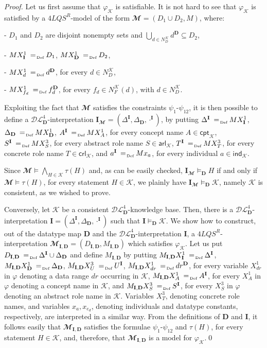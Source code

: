 \documentclass[a4paper]{llncs}
\newcommand{\defAs}{\mathrel{\makebox{\:= \hspace{-.2cm} \raisebox{-0.5 ex}[0 ex][0 ex]{\tiny Def}}}}
\newcommand{\shdlss}{\mathcal{DL}_{\D}^{4}}
\newcommand{\flqsr}{\ensuremath{4LQS^R}}
\newcommand{\I}{\mathbf{I}}
\newcommand{\D}{\mathbf{D}}
\newcommand{\ck}{\mathsf{cpt}_\mathcal{K}}
\newcommand{\ark}{\mathsf{arl}_\mathcal{K}}
\newcommand{\crk}{\mathsf{crl}_\mathcal{K}}
\newcommand{\ik}{\mathsf{ind}_\mathcal{K}}
\begin{document}
\begin{proof}
Let us first assume that $\varphi_{\mathcal{K}}$ is satisfiable. It is not hard to see that $\varphi_{\mathcal{K}}$ is satisfied by a \flqsr-model of the form $\mathbfcal{M} = (D_1 \cup D_2, M)$, where:

\medskip
- $D_1$ and $D_2$ are disjoint nonempty sets and $\underset{d \in N_{D}^\mathcal{K}}\bigcup d^{\D} \subseteq D_2$,

- $MX_{\I}^1 \defAs D_1$, $MX_{\D}^1 \defAs D_2$,

- $MX_{d}^1 \defAs d^{\D}$, for every $d \in N_{D}^\mathcal{K}$,

- $MX_{f_d}^1 \defAs f_d^{\D}$, for every $f_d \in N_{F}^\mathcal{K}(d)$, with $d \in N_{D}^\mathcal{K}$.

\smallskip
\noindent
Exploiting the fact that $\mathbfcal{M}$ satisfies the constraints $\psi_1$-$\psi_{12}$, it is then possible to define a $\shdlss$-interpretation $\I_{\mathbfcal{M}} = (\Delta^{\I}, \Delta_{\D}, \cdot^{\I})$, by putting $\Delta^{\I} \defAs MX_{\I}^1$, $\Delta_{\D} \defAs MX_{\D}^1$, $A^\I \defAs MX_{A}^1$, for every concept name $A \in \ck$, $S^\I \defAs MX_{S}^3$, for every abstract role name $S \in \ark$, $T^\I \defAs MX_{T}^3$, for every concrete role name $T \in \crk$, and $a^\I \defAs Mx_{a}$, for every individual $a \in \ik$.

Since $\mathbfcal{M} \models \underset {H \in \mathcal{K}}\bigwedge \tau(H)$ and, as can be easily checked, $\I_{\mathbfcal{M}} \models_{\D} H$ if and only if $\mathbfcal{M} \models \tau(H)$, for every statement $H \in \mathcal{K}$, we plainly have $\I_{\mathbfcal{M}} \models_{\D} \mathcal{K}$, namely $\mathcal{K}$ is consistent, as we wished to prove.

Conversely, let $\mathcal{K}$ be a consistent $\shdlss$-knowledge base. Then, there is a $\shdlss$-interpretation $\I = (\Delta^{\I}, \Delta_{\D}, \cdot^{\I})$ such that $\I \models_{\D} \mathcal{K}$. We show how to construct, out of the datatype map $\D$ and the $\shdlss$-interpretation $\I$, a \flqsr-interpretation $\mathbfcal{M}_{\I,\D} = (D_{\I,\D}, M_{\I,\D})$ which satisfies $\varphi_{\mathcal{K}}$. Let us put $D_{\I,\D} \defAs \Delta^{\I} \cup \Delta_{\D}$ and define $M_{\I,\D}$ by putting $M_{\I,\D} X_{\I}^1 \defAs \Delta^{\I}$, $M_{\I,\D} X_{\D}^1 \defAs \Delta_{\D}$,  $M_{\I,\D} X_{U}^3 \defAs U^{\I}$, $M_{\I,\D} X_{dr}^1 \defAs dr^{\D}$, for every variable $X_{dr}^1$ in $\varphi$ denoting a data range $dr$ occurring in $\mathcal{K}$, $M_{\I,\D} X_{A}^1 \defAs A^{\I}$, for every $X_{A}^1$ in $\varphi$ denoting a concept name in $\mathcal{K}$, and $M_{\I,\D} X_{S}^3 \defAs S^{\I}$, for every $X_{S}^3$ in $\varphi$ denoting an abstract role name in $\mathcal{K}$. Variables $X_{T}^3$, denoting concrete role names, and variables $x_a, x_{e_d}$, denoting individuals and datatype constants, respectively, are interpreted in a similar way. From the definitions of $\D$ and $\I$, it follows easily that  $\mathbfcal{M}_{\I,\D}$ satisfies the formulae $\psi_1$-$\psi_{12}$ and $\tau(H)$, for every statement $H \in \mathcal{K}$, and, therefore, that $\mathbfcal{M}_{\I,\D}$ is a model for $\varphi_{\mathcal{K}}$.\qed
\end{proof}
\end{document}
